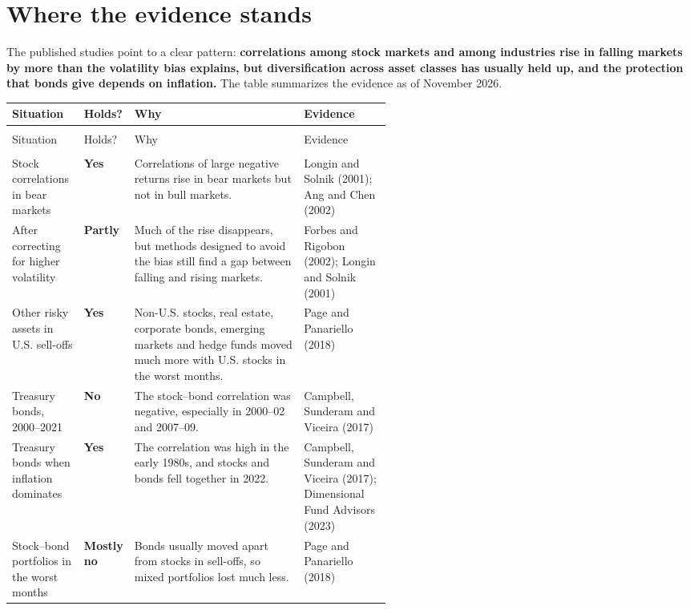 \section{Where the evidence stands}
\label{sec:13-verdict}

The published studies point to a clear pattern: \textbf{correlations among stock markets and among industries rise in falling markets by more than the volatility bias explains, but diversification across asset classes has usually held up, and the protection that bonds give depends on inflation.} The table summarizes the evidence as of November 2026.

{\small
\begin{longtable}{@{}>{\raggedright\arraybackslash}p{0.19\linewidth}>{\raggedright\arraybackslash}p{0.13\linewidth}>{\raggedright\arraybackslash}p{}>{\raggedright\arraybackslash}p{0.23\linewidth}@{}}
\toprule
Situation & Holds? & Why & Evidence \\
\midrule
\endfirsthead
\multicolumn{4}{@{}l}{\emph{(continued)}} \\
\toprule
Situation & Holds? & Why & Evidence \\
\midrule
\endhead
\midrule
\multicolumn{4}{r@{}}{\emph{(continued on the next page)}} \\
\endfoot
\bottomrule
\endlastfoot
Stock correlations in bear markets & \textbf{Yes} & Correlations of large negative returns rise in bear markets but not in bull markets. & Longin and Solnik (2001); Ang and Chen (2002) \\*
\addlinespace[3pt]
After correcting for higher volatility & \textbf{Partly} & Much of the rise disappears, but methods designed to avoid the bias still find a gap between falling and rising markets. & Forbes and Rigobon (2002); Longin and Solnik (2001) \\
\addlinespace[3pt]
Other risky assets in U.S. sell-offs & \textbf{Yes} & Non-U.S. stocks, real estate, corporate bonds, emerging markets and hedge funds moved much more with U.S. stocks in the worst months. & Page and Panariello (2018) \\
\addlinespace[3pt]
Treasury bonds, 2000--2021 & \textbf{No} & The stock--bond correlation was negative, especially in 2000--02 and 2007--09. & Campbell, Sunderam and Viceira (2017) \\
\addlinespace[3pt]
Treasury bonds when inflation dominates & \textbf{Yes} & The correlation was high in the early 1980s, and stocks and bonds fell together in 2022. & Campbell, Sunderam and Viceira (2017); Dimensional Fund Advisors (2023) \\*
\addlinespace[3pt]
Stock--bond portfolios in the worst months & \textbf{Mostly no} & Bonds usually moved apart from stocks in sell-offs, so mixed portfolios lost much less. & Page and Panariello (2018) \\
\end{longtable}
\addtocounter{table}{-1}%
}

